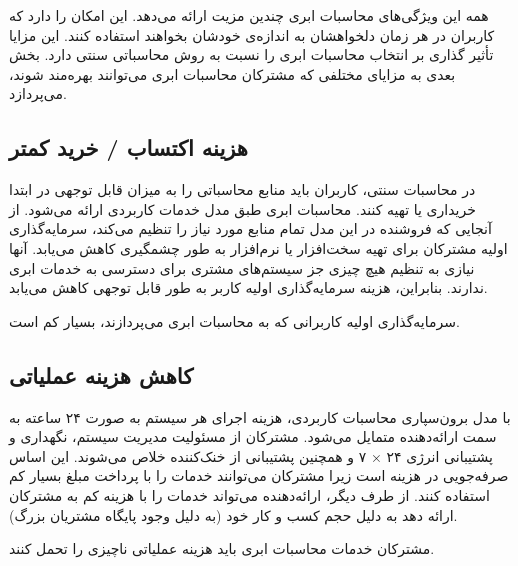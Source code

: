 \documentclass{book}
\begin{document}
            همه این ویژگی‌های محاسبات ابری چندین مزیت ارائه می‌دهد. این امکان را دارد که کاربران در هر زمان دلخواهشان به اندازه‌ی خودشان بخواهند استفاده کنند. این مزایا تأثیر گذاری بر انتخاب محاسبات ابری را نسبت به روش محاسباتی سنتی دارد. بخش بعدی به مزایای مختلفی که مشترکان محاسبات ابری می‌توانند بهره‌مند شوند، می‌پردازد.

            \subsection{هزینه اکتساب / خرید کمتر}

                در محاسبات سنتی، کاربران باید منابع محاسباتی را به میزان قابل توجهی در ابتدا خریداری یا تهیه کنند. محاسبات ابری طبق مدل خدمات کاربردی ارائه می‌شود. از آنجایی که فروشنده در این مدل تمام منابع مورد نیاز را تنظیم می‌کند، سرمایه‌گذاری اولیه مشترکان برای تهیه سخت‌افزار یا نرم‌افزار به طور چشمگیری کاهش می‌یابد. آنها نیازی به تنظیم هیچ چیزی جز سیستم‌های مشتری برای دسترسی به خدمات ابری ندارند. بنابراین، هزینه سرمایه‌گذاری اولیه کاربر به طور قابل توجهی کاهش می‌یابد.

                \begin{addinfo}
                    
                    سرمایه‌گذاری اولیه کاربرانی که به محاسبات ابری می‌پردازند، بسیار کم است.

                \end{addinfo}

            \subsection{کاهش هزینه عملیاتی}

                با مدل برون‌سپاری محاسبات کاربردی، هزینه اجرای هر سیستم به صورت ۲۴ ساعته به سمت ارائه‌دهنده متمایل می‌شود. مشترکان از مسئولیت مدیریت سیستم، نگهداری و پشتیبانی انرژی ۲۴ × ۷ و همچنین پشتیبانی از خنک‌کننده خلاص می‌شوند. این اساس صرفه‌جویی در هزینه است زیرا مشترکان می‌توانند خدمات را با پرداخت مبلغ بسیار کم استفاده کنند. از طرف دیگر، ارائه‌دهنده می‌تواند خدمات را با هزینه کم به مشترکان ارائه دهد به دلیل حجم کسب و کار خود (به دلیل وجود پایگاه مشتریان بزرگ).

                \begin{addinfo}
                    
                    مشترکان خدمات محاسبات ابری باید هزینه عملیاتی ناچیزی را تحمل کنند.

                \end{addinfo}
\end{document}
